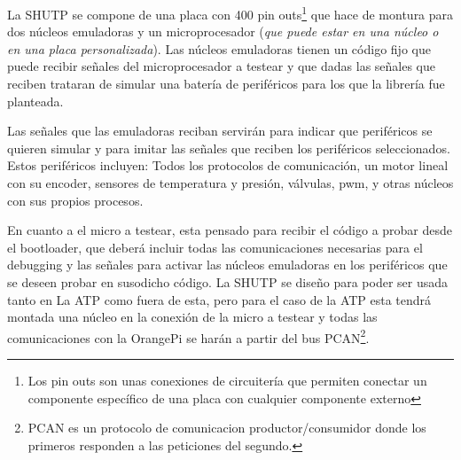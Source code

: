 \documentclass{report}
\begin{document}
La SHUTP se compone de una placa con 400 pin outs\footnote{Los pin outs son unas conexiones de circuitería que permiten conectar un componente específico de una placa con cualquier componente externo} que hace de montura para dos núcleos emuladoras y un microprocesador (\textit{que puede estar en una núcleo o en una placa personalizada}). Las núcleos emuladoras tienen un código fijo que puede recibir señales del microprocesador a testear y que dadas las señales que reciben trataran de simular una batería de periféricos para los que la librería fue planteada. \par
Las señales que las emuladoras reciban servirán para indicar que periféricos se quieren simular y para imitar las señales que reciben los periféricos seleccionados. Estos periféricos incluyen: Todos los protocolos de comunicación, un motor lineal con su encoder, sensores de temperatura y presión, válvulas, pwm, y otras núcleos con sus propios procesos. \par
En cuanto a el micro a testear, esta pensado para recibir el código a probar desde el bootloader, que deberá incluir todas las comunicaciones necesarias para el debugging y las señales para activar las núcleos emuladoras en los periféricos que se deseen probar en susodicho código. La SHUTP se diseño para poder ser usada tanto en La ATP como fuera de esta, pero para el caso de la ATP esta tendrá montada una núcleo en la conexión de la micro a testear y todas las comunicaciones con la OrangePi se harán a partir del bus PCAN\footnote{PCAN es un protocolo de comunicacion productor/consumidor donde los primeros responden a las peticiones del segundo.}.
\par \vspace{0.3cm}
\end{document}
